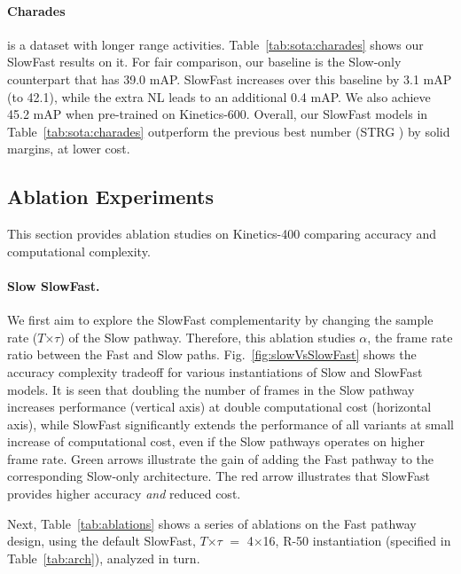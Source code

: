 \documentclass[10pt,twocolumn,letterpaper]{article}
\newcommand{\figref}[1]{Fig.~\ref{#1}}
\newcommand{\tblref}[1]{Table~\ref{#1}}
\def\x{$\times$}
\renewcommand{\omega}{\alpha}
\begin{document}
	\paragraph{Charades} \cite{Sigurdsson2016} is a dataset with longer range activities. \tblref{tab:sota:charades} shows our SlowFast results on it. For fair comparison, our baseline is the Slow-only counterpart that has 39.0 mAP. SlowFast increases over this baseline by 3.1 mAP (to 42.1), while the extra NL leads to an additional 0.4 mAP. We also achieve 45.2 mAP when pre-trained on Kinetics-600. Overall, our SlowFast models in \tblref{tab:sota:charades} outperform the previous best number (STRG \cite{Wang2018b}) by solid margins, at lower cost.
		
	\subsection{Ablation Experiments}
	This section provides ablation studies on Kinetics-400 comparing accuracy and computational complexity. %
	
	\paragraph{Slow \vs SlowFast.}
	We first aim to explore the SlowFast complementarity by changing the sample rate  ($T$\x$\tau$) of the Slow pathway. 
	Therefore, this ablation studies $\omega$, the frame rate ratio between the Fast and Slow paths. 	\figref{fig:slowVsSlowFast} shows the accuracy \vs complexity tradeoff for various instantiations of Slow and SlowFast models. It is seen that doubling the number of frames in the Slow pathway increases performance (vertical axis) at double computational cost (horizontal axis), while SlowFast significantly extends the performance of all variants at small increase of computational cost, even if the Slow pathways operates on higher frame rate. Green arrows illustrate the gain of adding the Fast pathway to the corresponding Slow-only architecture. The red arrow illustrates that SlowFast provides higher accuracy \textit{and} reduced cost. 
	
	Next, Table~\ref{tab:ablations} shows a series of ablations on the Fast pathway design, using the default SlowFast, $T$\x$\tau$ $=$ 4\x16, R-50 instantiation (specified in \tblref{tab:arch}), analyzed in turn.
	
\end{document}
